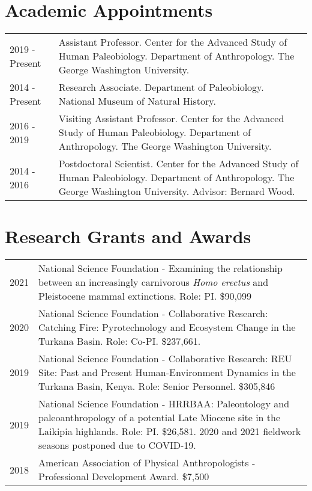 \documentclass{article}
\begin{document}
\section*{Academic Appointments}
\begin{tabular}{p{}p{}}
2019 - Present & Assistant Professor. Center for the Advanced Study of Human Paleobiology. Department of Anthropology. The George Washington University.\\[4pt]
2014 - Present & Research Associate. Department of Paleobiology.  National Museum of Natural History.\\
2016 - 2019 & Visiting Assistant Professor. Center for the Advanced Study of Human Paleobiology. Department of Anthropology. The George Washington University.\\[4pt]
2014 - 2016 & Postdoctoral Scientist. Center for the Advanced Study of Human Paleobiology. Department of Anthropology. The George Washington University. Advisor: Bernard Wood.\\[4pt]
\end{tabular} 

\section*{Research Grants and Awards}
\begin{tabular}{p{}p{}}
2021 & National Science Foundation - Examining the relationship between an increasingly carnivorous \emph{Homo erectus} and Pleistocene mammal extinctions. Role: PI. \$90,099\\[4pt]
2020 & National Science Foundation - Collaborative Research: Catching Fire: Pyrotechnology and Ecosystem Change in the Turkana Basin. Role: Co-PI. \$237,661.\\[4pt]
2019 &  National Science Foundation - Collaborative Research: REU Site: Past and Present Human-Environment Dynamics in the Turkana Basin, Kenya. Role: Senior Personnel. \$305,846\\[4pt]
2019 & National Science Foundation - HRRBAA: Paleontology and paleoanthropology of a potential Late Miocene site in the Laikipia highlands. Role: PI. \$26,581. 2020 and 2021 fieldwork seasons postponed due to COVID-19. \\[4pt]
2018 & American Association of Physical Anthropologists - Professional Development Award. \$7,500\\[4pt]

\end{tabular}
\end{document}
